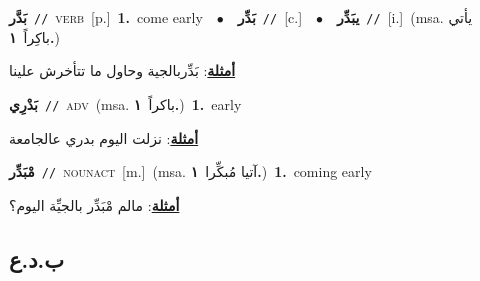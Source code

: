 \documentclass[10pt,a4paper,twoside]{article} %
\begin{document}
\begin{multicols}{2}
{\setlength\topsep{0pt}\textbf{\foreignlanguage{arabic}{بَدَّر}}\ {\color{gray}\texttt{//}\color{black}}\ \textsc{verb}\ [p.]\ \textbf{1.}~come early\ \ $\bullet$\ \ \setlength\topsep{0pt}\textbf{\foreignlanguage{arabic}{بَدِّر}}\ {\color{gray}\texttt{//}\color{black}}\ [c.]\ \ $\bullet$\ \ \setlength\topsep{0pt}\textbf{\foreignlanguage{arabic}{يبَدِّر}}\ {\color{gray}\texttt{//}\color{black}}\ [i.]\ \color{gray}(msa. \foreignlanguage{arabic}{يأتي باكِراً}~\foreignlanguage{arabic}{\textbf{١.}})\color{black}\  \begin{flushright}\color{gray}\foreignlanguage{arabic}{\textbf{\underline{\foreignlanguage{arabic}{أمثلة}}}: بَدِّربالجية وحاول ما تتأخرش علينا}\end{flushright}\color{black}} \vspace{2mm}

{\setlength\topsep{0pt}\textbf{\foreignlanguage{arabic}{بَدْرِي}}\ {\color{gray}\texttt{//}\color{black}}\ \textsc{adv}\ \color{gray}(msa. \foreignlanguage{arabic}{باكراً}~\foreignlanguage{arabic}{\textbf{١.}})\color{black}\ \textbf{1.}~early\  \begin{flushright}\color{gray}\foreignlanguage{arabic}{\textbf{\underline{\foreignlanguage{arabic}{أمثلة}}}: نزلت اليوم بدري عالجامعة}\end{flushright}\color{black}} \vspace{2mm}

{\setlength\topsep{0pt}\textbf{\foreignlanguage{arabic}{مْبَدِّر}}\ {\color{gray}\texttt{//}\color{black}}\ \textsc{noun\textunderscore act}\ [m.]\ \color{gray}(msa. \foreignlanguage{arabic}{آتيا مُبكِّرا}~\foreignlanguage{arabic}{\textbf{١.}})\color{black}\ \textbf{1.}~coming early\  \begin{flushright}\color{gray}\foreignlanguage{arabic}{\textbf{\underline{\foreignlanguage{arabic}{أمثلة}}}: مالم مْبَدِّر بالجيِّة اليوم؟}\end{flushright}\color{black}} \vspace{2mm}

\vspace{-3mm}
\subsection*{\color{blue}\foreignlanguage{arabic}{ب.د.ع}\color{blue}{}} 


\end{multicols}
\end{document}
